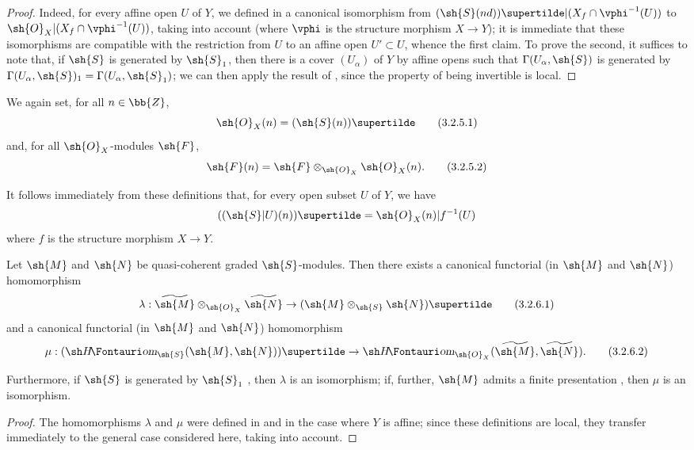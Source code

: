 \begin{proof}
Indeed, for every affine open $U$ of $Y$, we defined in  a canonical isomorphism from $(\sh{S}(nd))\supertilde|(X_f\cap\vphi^{-1}(U))$ to $\sh{O}_X|(X_f\cap\vphi^{-1}(U))$, taking  into account (where $\vphi$ is the structure morphism $X\to Y$);
it is immediate that these isomorphisms are compatible with the restriction from $U$ to an affine open $U'\subset U$, whence the first claim.
To prove the second, it suffices to note that, if $\sh{S}$ is generated by $\sh{S}_1$, then there is a cover $(U_\alpha)$ of $Y$ by affine opens such that $\Gamma(U_\alpha,\sh{S})$ is generated by $\Gamma(U_\alpha,\sh{S})_1=\Gamma(U_\alpha,\sh{S}_1)$;
we can then apply the result of , since the property of being invertible is local.
\end{proof}

We again set, for all $n\in\bb{Z}$,
\[
\label{II.3.2.5.1}
  \sh{O}_X(n) = (\sh{S}(n))\supertilde
\tag{3.2.5.1}
\]
and, for all $\sh{O}_X$-modules $\sh{F}$,
\[
\label{II.3.2.5.2}
  \sh{F}(n) = \sh{F}\otimes_{\sh{O}_X}\sh{O}_X(n).
\tag{3.2.5.2}
\]

It follows immediately from these definitions that, for every open subset $U$ of $Y$, we have
\[
  ((\sh{S}|U)(n))\supertilde = \sh{O}_X(n)|f^{-1}(U)
\]
where $f$ is the structure morphism $X\to Y$.

\begin{proposition}[3.2.6]
\label{II.3.2.6}
Let $\sh{M}$ and $\sh{N}$ be quasi-coherent graded $\sh{S}$-modules.
Then there exists a canonical functorial (in $\sh{M}$ and $\sh{N}$) homomorphism
\[
\label{II.3.2.6.1}
  \lambda : \widetilde{\sh{M}}\otimes_{\sh{O}_X}\widetilde{\sh{N}} \to (\sh{M}\otimes_{\sh{S}}\sh{N})\supertilde
\tag{3.2.6.1}
\]
and a canonical functorial (in $\sh{M}$ and $\sh{N}$) homomorphism
\[
\label{II.3.2.6.2}
  \mu : (\shHom_{\sh{S}}(\sh{M},\sh{N}))\supertilde \to \shHom_{\sh{O}_X}(\widetilde{\sh{M}},\widetilde{\sh{N}}).
\tag{3.2.6.2}
\]

Furthermore, if $\sh{S}$ is generated by $\sh{S}_1$ , then $\lambda$ is an isomorphism;
if, further, $\sh{M}$ admits a finite presentation , then $\mu$ is an isomorphism.
\end{proposition}

\begin{proof}
The homomorphisms $\lambda$ and $\mu$ were defined in  and  in the case where $Y$ is affine;
since these definitions are local, they transfer immediately to the general case considered here, taking  into account.
\end{proof}

